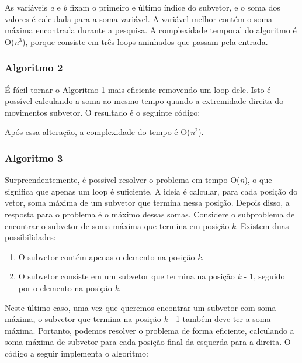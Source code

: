 As variáveis \textit{a} e \textit{b} fixam o primeiro e último índice do subvetor, e o soma dos valores é calculada para a soma variável. A variável melhor contém o soma máxima encontrada durante a pesquisa. A complexidade temporal do algoritmo é O(\textit{n}$^3$), porque consiste em três loops aninhados que passam pela entrada.

\subsubsection{Algoritmo 2}

É fácil tornar o Algoritmo 1 mais eficiente removendo um loop dele. Isto é possível calculando a soma ao mesmo tempo quando a extremidade direita do movimentos subvetor. O resultado é o seguinte código:




Após essa alteração, a complexidade do tempo é O(\textit{n}$^2$).

\subsubsection{Algoritmo 3}

Surpreendentemente, é possível resolver o problema em tempo O(\textit{n}), o que significa que apenas um loop é suficiente. A ideia é calcular, para cada posição do vetor, soma máxima de um subvetor que termina nessa posição. Depois disso, a resposta para o problema é o máximo dessas somas. Considere o subproblema de encontrar o subvetor de soma máxima que termina em posição \textit{k}. Existem duas possibilidades:

    \begin{enumerate}
        \item O subvetor contém apenas o elemento na posição \textit{k}.
        \item O subvetor consiste em um subvetor que termina na posição \textit{k} - 1, seguido por o elemento na posição \textit{k}.
    \end{enumerate}

Neste último caso, uma vez que queremos encontrar um subvetor com soma máxima, o subvetor que termina na posição \textit{k} - 1 também deve ter a soma máxima. Portanto, podemos resolver o problema de forma eficiente, calculando a soma máxima de subvetor para cada posição final da esquerda para a direita. O código a seguir implementa o algoritmo:

